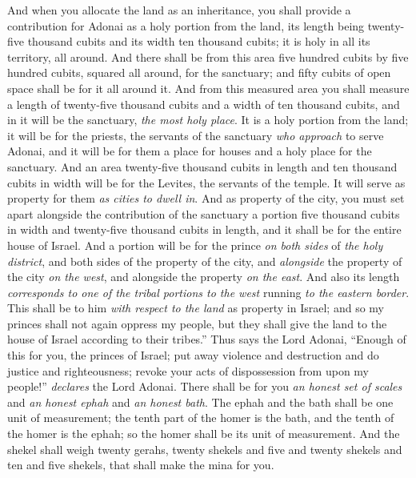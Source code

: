 \begin{biblechapter} %
 And when you allocate the land as an inheritance, you shall provide a contribution for Adonai as a holy portion from the land, its length being twenty-five thousand cubits and its width ten thousand cubits; it is holy in all its territory, all around.
\verse And there shall be from this area five hundred cubits by five hundred cubits, squared all around, for the sanctuary; and fifty cubits﻿ of open space shall be for it all around it.
\verse And from this measured area you shall measure a length of twenty-five thousand cubits and a width of ten thousand cubits, and in it will be the sanctuary, \textit{the most holy place}.
\verse It is a holy portion from the land; it will be for the priests, the servants of the sanctuary \textit{who approach} to serve Adonai, and it will be for them a place for houses and a holy place for the sanctuary.
\verse And an area twenty-five thousand cubits in length and ten thousand cubits in width will be for the Levites, the servants of the temple. It will serve as property for them \textit{as cities to dwell in}.
\verse And as property of the city, you must set apart alongside the contribution of the sanctuary a portion five thousand cubits in width and twenty-five thousand cubits in length, and it shall be for the entire house of Israel.
\verse And a portion will be for the prince \textit{on both sides} of \textit{the holy district}, and both sides of the property of the city, and \textit{alongside} the property of the city \textit{on the west}, and alongside the property \textit{on the east}. And also its length \textit{corresponds to one of the tribal portions to the west} running \textit{to the eastern border}.
\verse This shall be to him \textit{with respect to the land} as property in Israel; and so my princes shall not again oppress my people, but they shall give the land to the house of Israel according to their tribes.”
\verse Thus says the Lord Adonai, “Enough of this for you, the princes of Israel; put away violence and destruction and do justice and righteousness; revoke your acts of dispossession from upon my people!” \textit{declares} the Lord Adonai.
\verse There shall be for you \textit{an honest set of scales} and \textit{an honest ephah} and \textit{an honest bath}.
\verse The ephah and the bath shall be one unit of measurement; the tenth part of the homer is the bath, and the tenth of the homer is the ephah; so the homer shall be its unit of measurement.
\verse And the shekel shall weigh twenty gerahs, twenty shekels and five and twenty shekels and ten and five shekels, that shall make the mina for you.

\end{biblechapter}
